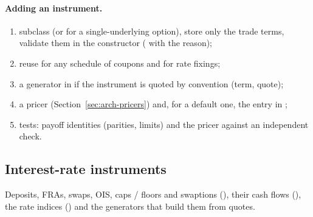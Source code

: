 \paragraph{Adding an instrument.}
\begin{enumerate}[nosep]
  \item subclass  (or  for a single-underlying option), store only the trade terms, validate
        them in the constructor ( with the reason);
  \item reuse  for any schedule of coupons and  for rate fixings;
  \item a generator in  if the instrument is quoted by convention (term, quote);
  \item a pricer (Section~\ref{sec:arch-pricers}) and, for a default one, the  entry in
        ;
  \item tests: payoff identities (parities, limits) and the pricer against an independent check.
\end{enumerate}

\subsection{Interest-rate instruments}\label{sec:arch-products}\label{sec:arch-rates-instruments}
Deposits, FRAs, swaps, OIS, caps / floors and swaptions (), their cash flows (), the
rate indices () and the generators that build them from quotes.

